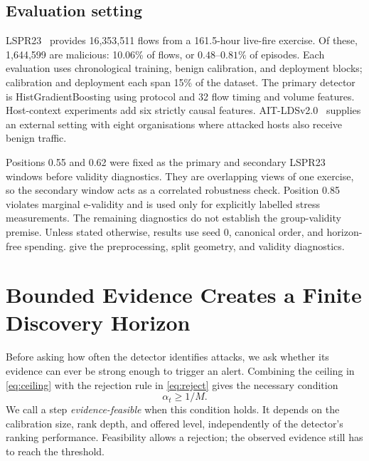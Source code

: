 \documentclass[conference]{IEEEtran}
\newcommand{\ceil}{M}
\newcommand{\alphat}{\alpha_t}
\begin{document}
\subsection{Evaluation setting}\label{sec:data}

LSPR23~\cite{lspr23} provides 16,353,511 flows from a 161.5-hour live-fire exercise. Of these,
1,644,599 are malicious: 10.06\% of flows, or $0.48$--$0.81\%$ of episodes. Each evaluation uses
chronological training, benign calibration, and deployment blocks; calibration and deployment each
span 15\% of the dataset. The primary detector is HistGradientBoosting using protocol and 32 flow
timing and volume features. Host-context experiments add six strictly causal features.
AIT-LDSv2.0~\cite{aitlds} supplies an external setting with eight organisations where attacked hosts
also receive benign traffic.

Positions 0.55 and 0.62 were fixed as the primary and secondary LSPR23 windows before validity
diagnostics. They are overlapping views of one exercise, so the secondary window acts as a correlated
robustness check. Position 0.85 violates marginal e-validity and is used only for explicitly labelled
stress measurements. The remaining diagnostics do not establish the group-validity premise.
Unless stated otherwise, results use seed 0, canonical order, and horizon-free spending.
 give the preprocessing, split geometry, and validity
diagnostics.

\section{Bounded Evidence Creates a Finite Discovery Horizon}\label{sec:feasibility}

Before asking how often the detector identifies attacks, we ask whether its evidence can ever be
strong enough to trigger an alert. Combining the ceiling in \eqref{eq:ceiling} with the rejection
rule in \eqref{eq:reject} gives the necessary condition
\begin{equation}\label{eq:feas}
\alphat\ge1/\ceil.
\end{equation}
We call a step \emph{evidence-feasible} when this condition holds. It depends on the calibration size,
rank depth, and offered level, independently of the detector's ranking performance. Feasibility
allows a rejection; the observed evidence still has to reach the threshold.
\end{document}
